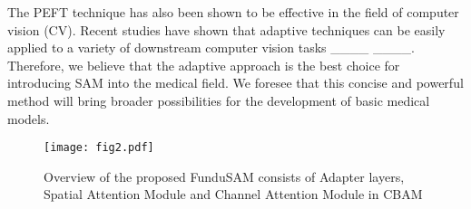 The PEFT technique has also been shown to be effective in the field of computer vision (CV). Recent studies have shown that adaptive techniques can be easily applied to a variety of downstream computer vision tasks ____ ____. Therefore, we believe that the adaptive approach is the best choice for introducing SAM into the medical field. We foresee that this concise and powerful method will bring broader possibilities for the development of basic medical models.

\begin{figure*}[!t]
    \centering
    \texttt{[image: fig2.pdf]}
\caption{Overview of the proposed FunduSAM consists of Adapter layers, Spatial Attention Module and Channel Attention Module in CBAM}
    \label{fig2_framework}
\end{figure*}